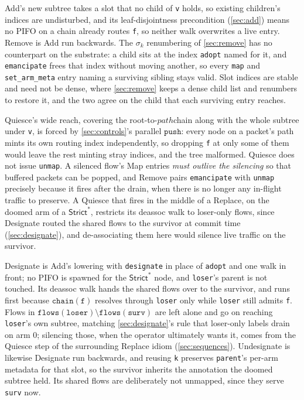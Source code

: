 \documentclass[sigplan,anonymous,review,nonacm]{acmart}
\newcommand{\push}{\ensuremath{\mathtt{push}}}
\newcommand{\notation}[1]{\ensuremath{#1}\ifmmode\else\xspace\fi}
\newcommand{\pth}{\notation{\mathit{path}}}
\newcommand{\Strictstar}{\textsf{Strict}^{*}}
\newcommand{\Add}{\textsf{Add}}
\newcommand{\Quiesce}{\textsf{Quiesce}}
\newcommand{\Remove}{\textsf{Remove}}
\newcommand{\Designate}{\textsf{Designate}}
\newcommand{\Undesignate}{\textsf{Undesignate}}
\newcommand{\Replace}{\textsf{Replace}}
\begin{document}
\Add{}'s new subtree takes a slot that no child of \texttt{v} holds, so existing children's indices are undisturbed, and its leaf-disjointness precondition (\cref{sec:add}) means no PIFO on a chain already routes \texttt{f}, so neither walk overwrites a live entry.
\Remove{} is \Add{} run backwards.
The \(\sigma_k\) renumbering of \cref{sec:remove} has no counterpart on the substrate: a child sits at the index \texttt{adopt} named for it, and \texttt{emancipate} frees that index without moving another, so every \texttt{map} and \texttt{set\_arm\_meta} entry naming a surviving sibling stays valid.
Slot indices are stable and need not be dense, where \cref{sec:remove} keeps a dense child list and renumbers to restore it, and the two agree on the child that each surviving entry reaches.

\Quiesce's wide reach, covering the root-to-\pth chain along with the whole subtree under \texttt{v}, is forced by \cref{sec:controls}'s parallel \push{}: every node on a packet's path mints its own routing index independently, so dropping \texttt{f} at only some of them would leave the rest minting stray indices, and the tree malformed.
\Quiesce{} does not issue \texttt{unmap}.
A silenced flow's Map entries \emph{must outlive the silencing} so that buffered packets can be popped, and \Remove{} pairs \texttt{emancipate} with \texttt{unmap} precisely because it fires after the drain, when there is no longer any in-flight traffic to preserve.
A \Quiesce{} that fires in the middle of a \Replace, on the doomed arm of a \(\Strictstar\), restricts its deassoc walk to loser-only flows, since \Designate{} routed the shared flows to the survivor at commit time (\cref{sec:designate}), and de-associating them here would silence live traffic on the survivor.

\Designate{} is \Add{}'s lowering with \texttt{designate} in place of \texttt{adopt} and one walk in front; no PIFO is spawned for the \(\Strictstar\) node, and \texttt{loser}'s parent is not touched.
Its deassoc walk hands the shared flows over to the survivor, and runs first because \(\mathtt{chain(f)}\) resolves through \texttt{loser} only while \texttt{loser} still admits \texttt{f}.
Flows in \(\mathtt{flows(loser)} \setminus \mathtt{flows(surv)}\) are left alone and go on reaching \texttt{loser}'s own subtree, matching \cref{sec:designate}'s rule that loser-only labels drain on arm 0; silencing those, when the operator ultimately wants it, comes from the \Quiesce{} step of the surrounding \Replace{} idiom (\cref{sec:sequences}).
\Undesignate{} is likewise \Designate{} run backwards, and reusing \texttt{k} preserves \texttt{parent}'s per-arm metadata for that slot, so the survivor inherits the annotation the doomed subtree held.
Its shared flows are deliberately not unmapped, since they serve \texttt{surv} now.

\clearpage
\end{document}
